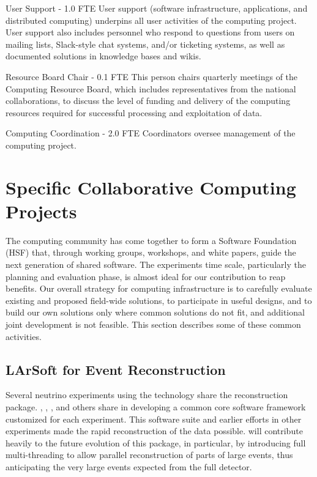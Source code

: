 \begin{description}
\item {User Support - 1.0 FTE}
User support (software infrastructure, applications, and distributed computing) underpins all user activities of the computing project. User support also includes personnel who respond to questions from users on mailing lists, Slack-style chat systems, and/or ticketing systems, as well as documented solutions in knowledge bases and wikis.%

\item {Resource Board Chair - 0.1 FTE}
This person chairs quarterly meetings of the Computing Resource Board, which includes representatives from the national  collaborations, to discuss the level of funding and delivery of the computing resources required for successful processing and exploitation of  data. %

\item {Computing Coordination - 2.0 FTE}
Coordinators oversee management of the computing project. 
\end{description}



\section{Specific Collaborative Computing Projects}
\label{ch:exec-comp-gov-coop}

The  computing community has come together to form a  Software Foundation (HSF)\cite{Alves:2017she} that, through working groups, workshops, and white papers, guide the next generation of shared  software.  The  experiments time scale, particularly the planning and evaluation phase, is almost ideal for our contribution to reap benefits.  Our overall strategy for computing infrastructure is to carefully evaluate existing and proposed field-wide solutions, to participate in useful designs, and to build our own solutions only where common solutions do not fit, and additional joint development is not feasible.   This section describes some of these common activities. 



\subsection{LArSoft for Event Reconstruction}

Several neutrino experiments using the  technology share the \cite{Snider:2017wjd} reconstruction package.  , , , and others share in developing a common core software framework customized for each experiment. This software suite and earlier efforts in other experiments made the rapid reconstruction of the  data possible.   will contribute heavily to  the future evolution of this package, in particular, by introducing full multi-threading to allow parallel reconstruction of parts of large events, thus anticipating the very large events expected from the full detector. 

